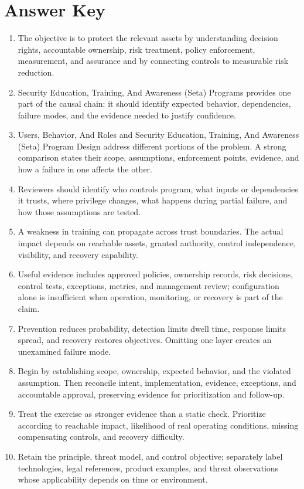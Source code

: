 \documentclass[11pt,letterpaper]{article}
\begin{document}
\section*{Answer Key}
\begin{enumerate}
\item The objective is to protect the relevant assets by understanding decision rights, accountable ownership, risk treatment, policy enforcement, measurement, and assurance and by connecting controls to measurable risk reduction.
\item Security Education, Training, And Awareness (Seta) Programs provides one part of the causal chain: it should identify expected behavior, dependencies, failure modes, and the evidence needed to justify confidence.
\item Users, Behavior, And Roles and Security Education, Training, And Awareness (Seta) Program Design address different portions of the problem. A strong comparison states their scope, assumptions, enforcement points, evidence, and how a failure in one affects the other.
\item Reviewers should identify who controls program, what inputs or dependencies it trusts, where privilege changes, what happens during partial failure, and how those assumptions are tested.
\item A weakness in training can propagate across trust boundaries. The actual impact depends on reachable assets, granted authority, control independence, visibility, and recovery capability.
\item Useful evidence includes approved policies, ownership records, risk decisions, control tests, exceptions, metrics, and management review; configuration alone is insufficient when operation, monitoring, or recovery is part of the claim.
\item Prevention reduces probability, detection limits dwell time, response limits spread, and recovery restores objectives. Omitting one layer creates an unexamined failure mode.
\item Begin by establishing scope, ownership, expected behavior, and the violated assumption. Then reconcile intent, implementation, evidence, exceptions, and accountable approval, preserving evidence for prioritization and follow-up.
\item Treat the exercise as stronger evidence than a static check. Prioritize according to reachable impact, likelihood of real operating conditions, missing compensating controls, and recovery difficulty.
\item Retain the principle, threat model, and control objective; separately label technologies, legal references, product examples, and threat observations whose applicability depends on time or environment.
\end{enumerate}
\end{document}
